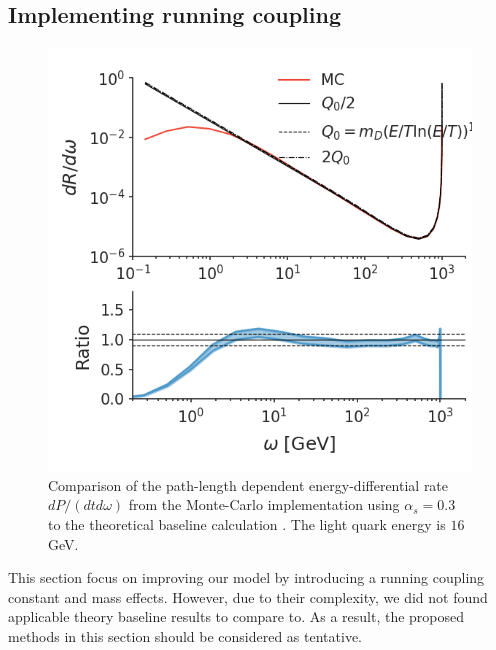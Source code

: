 \documentclass[aps, prc, reprint, amsmath, groupedaddress, nofootinbib]{revtex4-1}
\begin{document}
\subsection{Implementing running coupling}
\begin{figure}
\includegraphics[width=\columnwidth]{running.png}
\caption{Comparison of the path-length dependent energy-differential rate $dP/(dtd\omega)$ from the Monte-Carlo implementation using $\alpha_s = 0.3$ to the theoretical baseline calculation \cite{CaronHuot:2010bp}. The light quark energy is $16$ GeV.}
\label{fig:spectra-L-alphas=0.3}
\end{figure}

This section focus on improving our model by introducing a running coupling constant and mass effects. 
However, due to their complexity, we did not found applicable theory baseline results to compare to.
As a result, the proposed methods in this section should be considered as tentative.
\end{document}
